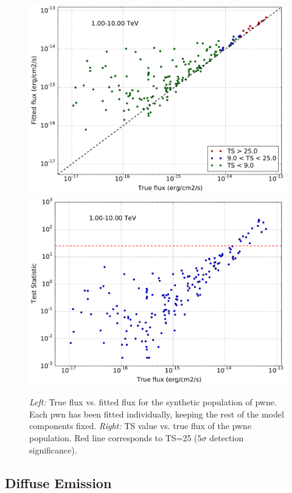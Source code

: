 \documentclass{article}
\begin{document}
\begin{figure}
\centering
{}
\includegraphics[width=1\textwidth]{Pictures/Flux_pop.pdf}
\endminipage 
{}
\includegraphics[width=1\textwidth]{Pictures/TS_pop.pdf}
\endminipage
  \caption{\textit{Left:} True flux vs. fitted flux for the synthetic population of \gls{pwne}. Each \gls{pwn} has been fitted individually, keeping the rest of the model components fixed. \textit{Right:} TS value vs. true flux of the \gls{pwne} population. Red line corresponds to TS=25 ($5\sigma$ detection significance).}
    \label{fig:pwnepopresults}
\end{figure}

\subsection{Diffuse Emission}
\end{document}
